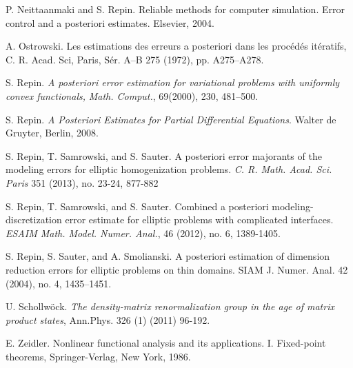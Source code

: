 \documentclass[amstex,amstext,amsfonts,epsf,12pt] {amsart}
\begin{document}
\begin{thebibliography}{99}
P. Neittaanmaki and S. Repin.
Reliable methods for computer simulation.
Error control and a posteriori estimates. Elsevier, 2004.

A. Ostrowski. Les estimations des erreurs a posteriori dans les proc\'ed\'es it\'eratifs,
C. R. Acad. Sci, Paris, S\'er. A–B 275 (1972), pp. A275–A278.


 S. Repin. \emph{A posteriori error estimation for variational
problems with uniformly convex functionals,} { \em Math. Comput.},
69(2000),  230,   481--500.


S. Repin. \emph{A Posteriori Estimates for Partial Differential Equations}.
Walter de Gruyter, Berlin, 2008.

S. Repin, T. Samrowski, and S. Sauter.
A posteriori error majorants of the modeling errors for elliptic homogenization problems.
\emph{C. R. Math. Acad. Sci. Paris} 351 (2013), no. 23-24, 877-882

S. Repin, T. Samrowski, and S. Sauter.
Combined a posteriori modeling-discretization error estimate for elliptic problems with complicated interfaces.
\emph{ESAIM Math. Model. Numer. Anal.}, 46 (2012), no. 6, 1389-1405.

S. Repin, S. Sauter, and A. Smolianski. A posteriori estimation of dimension reduction errors for elliptic problems on thin domains.
SIAM J. Numer. Anal. 42 (2004), no. 4, 1435--1451.

 U. Schollw\"ock. \emph{The density-matrix renormalization group in the age of
matrix product states}, Ann.Phys. 326 (1) (2011) 96-192.

% 

E. Zeidler. Nonlinear functional analysis and its applications.
I. Fixed-point theorems, Springer-Verlag, New York, 1986.

  \end{thebibliography}



\end{document}

